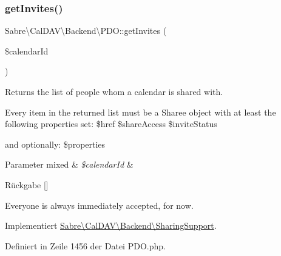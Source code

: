 \mbox{\label{class_sabre_1_1_cal_d_a_v_1_1_backend_1_1_p_d_o_afea8ccfdf65568def62aed599be0012c}} 
\subsubsection{\texorpdfstring{get\+Invites()}{getInvites()}}
{\footnotesize\ttfamily Sabre\textbackslash{}\+Cal\+D\+A\+V\textbackslash{}\+Backend\textbackslash{}\+P\+D\+O\+::get\+Invites (\begin{DoxyParamCaption}\item[{}]{\$calendar\+Id }\end{DoxyParamCaption})}

Returns the list of people whom a calendar is shared with.

Every item in the returned list must be a Sharee object with at least the following properties set\+: \$href \$share\+Access \$invite\+Status

and optionally\+: \$properties


\begin{DoxyParams}[1]{Parameter}
mixed & {\em \$calendar\+Id} & \\
\hline
\end{DoxyParams}
\begin{DoxyReturn}{Rückgabe}
\mbox{[}\mbox{]} 
\end{DoxyReturn}
Everyone is always immediately accepted, for now. 

Implementiert \mbox{\hyperlink{interface_sabre_1_1_cal_d_a_v_1_1_backend_1_1_sharing_support_a82223ce074cb75008e420beda5df94c8}{Sabre\textbackslash{}\+Cal\+D\+A\+V\textbackslash{}\+Backend\textbackslash{}\+Sharing\+Support}}.



Definiert in Zeile 1456 der Datei P\+D\+O.\+php.

\mbox{\label{class_sabre_1_1_cal_d_a_v_1_1_backend_1_1_p_d_o_ab20988584dd756f9b2742b8e67ddf514}} 
